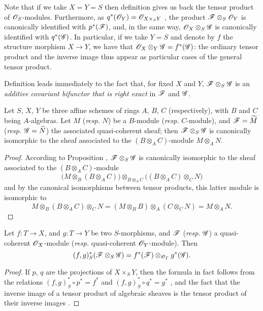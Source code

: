 Note that if we take $X=Y=S$ then definition  gives us back the tensor
product of $\mathscr{O}_S$-modules. Furthermore, as $q^*(\mathscr{O}_Y)=\mathscr{O}_{X\times_S Y}$
, the product $\mathscr{F}\otimes_S\mathscr{O}_Y$ is canonically
identified with $p^*(\mathscr{F})$, and, in the same way,
$\mathscr{O}_X\otimes_S\mathscr{G}$ is canonically identified with $q^*(\mathscr{G})$. In
particular, if we take $Y=S$ and denote by $f$ the structure morphism $X\to Y$,
we have that $\mathscr{O}_X\otimes_Y\mathscr{G}=f^*(\mathscr{G})$: the ordinary tensor
product and the inverse image thus appear as particular cases of the general
tensor product.

Definition  leads immediately to the fact that, for fixed $X$ and
$Y$, $\mathscr{F}\otimes_S\mathscr{G}$ is an \emph{additive covariant bifunctor that
is right exact} in $\mathscr{F}$ and $\mathscr{G}$.

\begin{prop}[9.1.3]
\label{1.9.1.3}
Let $S$, $X$, $Y$ be three affine schemes of rings
$A$, $B$, $C$ (respectively), with $B$ and $C$ being $A$-algebras. Let $M$
(\emph{resp.} $N$) be a $B$-module (\emph{resp.} $C$-module), and
$\mathscr{F}=\widetilde{M}$ (\emph{resp.} $\mathscr{G}=\widetilde{N}$) the
associated quasi-coherent sheaf; then $\mathscr{F}\otimes_S\mathscr{G}$ is
canonically isomorphic to the sheaf associated to the $(B\otimes_A C)$-module
$M\otimes_A N$.
\end{prop}

\begin{proof}
\label{proof-1.9.1.3}
According to Proposition , $\mathscr{F}\otimes_S\mathscr{G}$
is canonically isomorphic to the sheaf associated to the $(B\otimes_A C)$-module
\[
  \big(M\otimes_B(B\otimes_A C)\big)\otimes_{B\otimes_A C}\big((B\otimes_A C)\otimes_C N\big)
\]
and by the canonical isomorphisms between tensor
products, this latter module is isomorphic to
\[
  M\otimes_B(B\otimes_A C)\otimes_C N=(M\otimes_B B)\otimes_A(C\otimes_C N)=M\otimes_A N.
\]
\end{proof}

\begin{prop}[9.1.4]
\label{1.9.1.4}
Let $f:T\to X$, and $g:T\to Y$ be
two $S$-morphisms, and $\mathscr{F}$ (\emph{resp.} $\mathscr{G}$) a quasi-coherent
$\mathscr{O}_X$-module (\emph{resp.} quasi-coherent $\mathscr{O}_Y$-module). Then
\[
  (f,g)^*_S(\mathscr{F}\otimes_S\mathscr{G})=f^*(\mathscr{F})\otimes_{\mathscr{O}_T}g^*(\mathscr{G}).
\]
\end{prop}

\begin{proof}
\label{proof-1.9.14}
If $p$, $q$ are the projections of $X\times_S Y$, then the formula in fact follows
from the relations $(f,g)^*_S\circ p^*=f^*$ and
$(f,g)^*_S\circ q^*=g^*$ , and the fact that the inverse
image of a tensor product of algebraic sheaves is the tensor product of their inverse
images .
\end{proof}

